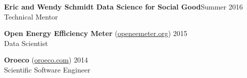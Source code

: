 \documentclass[margin,line]{resume}
\begin{document}
\begin{resume}
        {\bf Eric and Wendy Schmidt Data Science for Social Good}\hfill{Summer 2016}\\
	Technical Mentor

	{\bf Open Energy Efficiency Meter} (\href{http://www.openeemeter.org/}{openeemeter.org}) \hfill {2015} \\
	Data Scientist

	{\bf Oroeco} (\href{http://www.oroeco.com}{oroeco.com}) \hfill {2014} \\
	Scientific Software Engineer %

\end{resume}
\end{document}
